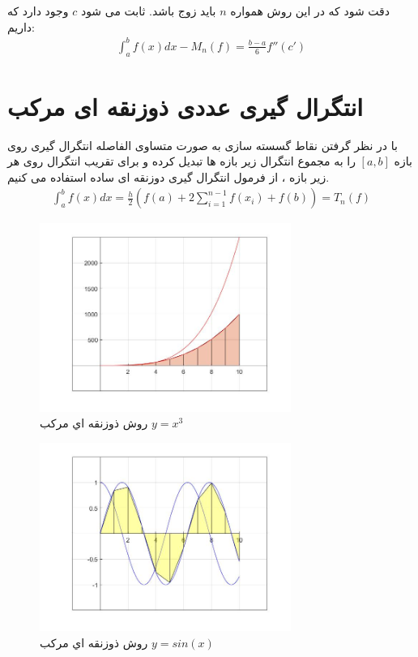 \documentclass{article}
\begin{document}
دقت شود که در این روش همواره $n$
باید زوج باشد.
ثابت می شود $c$
وجود دارد که داریم:
\\
\begin{align*}
  \int_a^{b} f(x)dx - M_{n}(f) = \frac{b-a}{6}f''(c')  
\end{align*}


\section{انتگرال گیری عددی ذوزنقه ای مرکب}
با در نظر گرفتن نقاط گسسته سازی به صورت متساوی الفاصله انتگرال گیری روی بازه $[a,b]$
را به مجموع انتگرال زیر بازه ها تبدیل کرده و برای تقریب انتگرال روی هر زیر بازه ، از فرمول انتگرال گیری دوزنقه ای ساده استفاده می کنیم.
\citep{Numerical_integration}
\\
\begin{align*}
    \int_{a}^{b} f(x)dx =\frac{h}{2}(f(a)+2\sum_{i=1}^{n-1} f(x_{i}) +f(b)) = T_{n}(f)
\end{align*}



\begin{figure}[!h]
    \centering
\includegraphics[width=8.2cm]{pic27codeIntegral.jpg}
    \caption{ روش ذوزنقه اي مرکب $y=x^3$ }
    \label{fig:انتگرال خط}
\end{figure}

\begin{figure}[!h]
    \centering
\includegraphics[width=8.2cm]{pic28codeIntegral.jpg}
    \caption{ روش ذوزنقه اي مرکب $y=sin(x)$ }
    \label{fig:انتگرال خط}
\end{figure}
\end{document}
